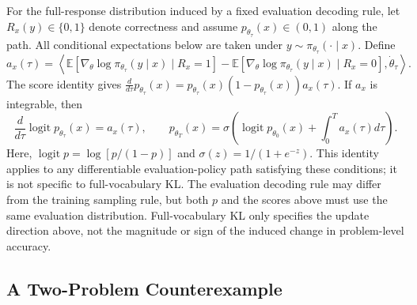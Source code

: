 \documentclass{article}
\theoremstyle{opdplain}
\begin{document}
For the full-response distribution induced by a fixed evaluation decoding rule, let $R_x(y)\in\{0,1\}$ denote correctness and assume $p_{\theta_\tau}(x)\in(0,1)$ along the path. All conditional expectations below are taken under $y\sim\pi_{\theta_\tau}(\cdot\mid x)$. Define
\[
 a_x(\tau)=\left\langle
 \mathbb E[\nabla_\theta\log\pi_{\theta_\tau}(y\mid x)\mid R_x=1]-
 \mathbb E[\nabla_\theta\log\pi_{\theta_\tau}(y\mid x)\mid R_x=0],
 \dot\theta_\tau\right\rangle.
\]
The score identity gives $\frac{d}{d\tau}p_{\theta_\tau}(x)=p_{\theta_\tau}(x)(1-p_{\theta_\tau}(x))a_x(\tau)$. If $a_x$ is integrable, then
\[
 \frac{d}{d\tau}\operatorname{logit}p_{\theta_\tau}(x)=a_x(\tau),\qquad
 p_{\theta_T}(x)=\sigma\!\left(\operatorname{logit}p_{\theta_0}(x)+\int_0^T a_x(\tau)d\tau\right).
\]
Here, $\operatorname{logit}p=\log[p/(1-p)]$ and $\sigma(z)=1/(1+e^{-z})$. This identity applies to any differentiable evaluation-policy path satisfying these conditions; it is not specific to full-vocabulary KL. The evaluation decoding rule may differ from the training sampling rule, but both $p$ and the scores above must use the same evaluation distribution. Full-vocabulary KL only specifies the update direction above, not the magnitude or sign of the induced change in problem-level accuracy.

\subsection{A Two-Problem Counterexample}
\label{app:opd-counterexample}
\end{document}
